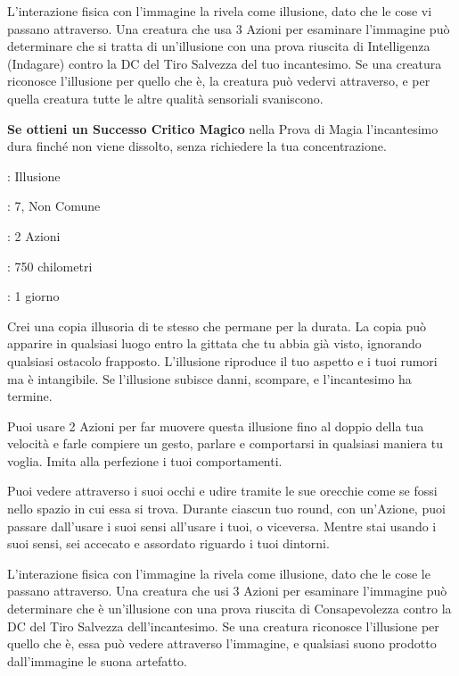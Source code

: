 \begin{multicols}{2}
L'interazione fisica con l'immagine la rivela come illusione, dato che le cose vi passano attraverso. Una creatura che usa 3 Azioni per esaminare l'immagine può determinare che si tratta di un'illusione con una prova riuscita di Intelligenza (Indagare) contro la DC del Tiro Salvezza del tuo incantesimo. Se una creatura riconosce l'illusione per quello che è, la creatura può vedervi attraverso, e per quella creatura tutte le altre qualità sensoriali svaniscono.

\textbf{Se ottieni un Successo Critico Magico} nella Prova di Magia l'incantesimo dura finché non viene dissolto, senza richiedere la tua concentrazione.

\noindent\colorbox{OBSSgold!10}{
\begin{minipage}{0.95\linewidth}
\begin{description}[noitemsep, topsep=0pt, parsep=0pt, partopsep=0pt, leftmargin=0cm, labelwidth=1.3cm]
	\item[\textbf{Lista}]: Illusione
	\item[\textbf{Livello}]: 7, Non Comune
	\item[\textbf{Lancio}]: 2 Azioni
	\item[\textbf{Gittata}]: 750 chilometri
	\item[\textbf{Durata}]: 1 giorno
\end{description}
\end{minipage}}\smallskip

Crei una copia illusoria di te stesso che permane per la durata. La copia può apparire in qualsiasi luogo entro la gittata che tu abbia già visto, ignorando qualsiasi ostacolo frapposto. L'illusione riproduce il tuo aspetto e i tuoi rumori ma è intangibile. Se l'illusione subisce danni, scompare, e l'incantesimo ha termine.

Puoi usare 2 Azioni per far muovere questa illusione fino al doppio della tua velocità e farle compiere un gesto, parlare e comportarsi in qualsiasi maniera tu voglia. Imita alla perfezione i tuoi comportamenti.

Puoi vedere attraverso i suoi occhi e udire tramite le sue orecchie come se fossi nello spazio in cui essa si trova. Durante ciascun tuo round, con un'Azione, puoi passare dall'usare i suoi sensi all'usare i tuoi, o viceversa. Mentre stai usando i suoi sensi, sei accecato e assordato riguardo i tuoi dintorni.

L'interazione fisica con l'immagine la rivela come illusione, dato che le cose le passano attraverso. Una creatura che usi 3 Azioni per esaminare l'immagine può determinare che è un'illusione con una prova riuscita di Consapevolezza contro la DC del Tiro Salvezza dell'incantesimo. Se una creatura riconosce l'illusione per quello che è, essa può vedere attraverso l'immagine, e qualsiasi suono prodotto dall'immagine le suona artefatto.


\end{multicols}

